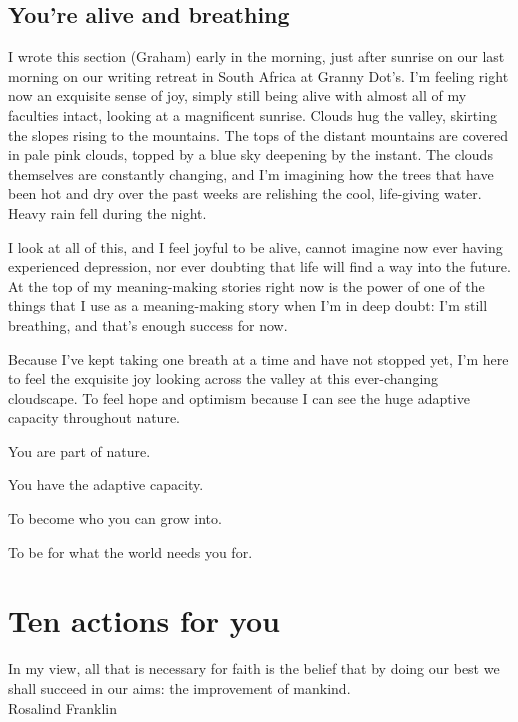 \section{You're alive and breathing}
I wrote this section (Graham) early in the morning, just after sunrise on our last morning on our writing retreat in South Africa at Granny Dot’s. I'm feeling right now an exquisite sense of joy, simply still being alive with almost all of my faculties intact, looking at a magnificent sunrise. Clouds hug the valley, skirting the slopes rising to the mountains. The tops of the distant mountains are covered in pale pink clouds, topped by a blue sky deepening by the instant. The clouds themselves are constantly changing, and I'm imagining how the trees that have been hot and dry over the past weeks are relishing the cool, life-giving water. Heavy rain fell during the night.


I look at all of this, and I feel joyful to be alive, cannot imagine now ever having experienced depression, nor ever doubting that life will find a way into the future. At the top of my meaning-making stories right now is the power of one of the things that I use as a meaning-making story when I'm in deep doubt: I'm still breathing, and that's enough success for now.


Because I've kept taking one breath at a time and have not stopped yet, I'm here to feel the exquisite joy looking across the valley at this ever-changing cloudscape. To feel hope and optimism because I can see the huge adaptive capacity throughout nature. 


\smallskip


You are part of nature. 


You have the adaptive capacity.


To become who you can grow into.


To be for what the world needs you for.






\chapter{Ten actions for you}


\begin{chapterquotation}
In my view, all that is necessary for faith is the belief that by doing our best we shall succeed in our aims: the improvement of mankind.\\
\raggedleft\textemdash Rosalind Franklin
\end{chapterquotation}



